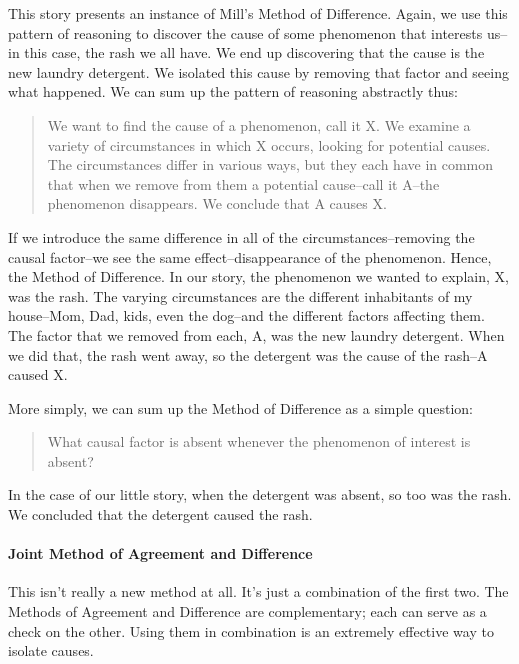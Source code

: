 This story presents an instance of Mill's Method of Difference. Again, we use this pattern of
reasoning to discover the cause of some phenomenon that interests us--in this case, the rash we
all have. We end up discovering that the cause is the new laundry detergent. We isolated this cause
by removing that factor and seeing what happened. We can sum up the pattern of reasoning
abstractly thus:

\begin{quote}
We want to find the cause of a phenomenon, call it X. We examine a variety of
circumstances in which X occurs, looking for potential causes. The circumstances differ in
various ways, but they each have in common that when we remove from them a potential
cause--call it A--the phenomenon disappears. We conclude that A causes X.
\end{quote}

If we introduce the same difference in all of the circumstances--removing the causal factor--we
see the same effect--disappearance of the phenomenon. Hence, the Method of Difference. In our
story, the phenomenon we wanted to explain, X, was the rash. The varying circumstances are the
different inhabitants of my house--Mom, Dad, kids, even the dog--and the different factors
affecting them. The factor that we removed from each, A, was the new laundry detergent. When
we did that, the rash went away, so the detergent was the cause of the rash--A caused X.

More simply, we can sum up the Method of Difference as a simple question:

\begin{quote}What causal factor is absent whenever the phenomenon of interest is absent?
\end{quote}

In the case of our little story, when the detergent was absent, so too was the rash. We concluded
that the detergent caused the rash.

\paragraph{Joint Method of Agreement and Difference}

This isn't really a new method at all. It's just a combination of the first two. The Methods of
Agreement and Difference are complementary; each can serve as a check on the other. Using them
in combination is an extremely effective way to isolate causes.

